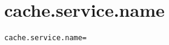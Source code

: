 \section{cache.service.name}
\label{configuration:CacheServiceName}
\ClearAPI
\TODO
{}
\begin{lstlisting}[style=Props,caption={Usage example for \textit{cache.service.name}}]
cache.service.name=
\end{lstlisting}
